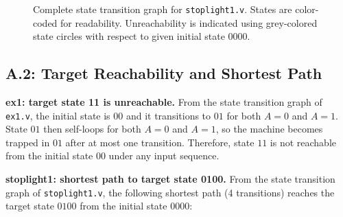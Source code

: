 \documentclass[10pt]{article}
\begin{document}
\begin{figure}[H]
\center
\caption{Complete state transition graph for \texttt{stoplight1.v}. States are color-coded for readability. Unreachability is indicated using grey-colored state circles with respect to given initial state 0000.}
\end{figure}




\subsection*{A.2: Target Reachability and Shortest Path}

\textbf{ex1: target state 11 is unreachable.}
From the state transition graph of \texttt{ex1.v}, the initial state is $00$ and it transitions to $01$ for both $A=0$ and $A=1$.
State $01$ then self-loops for both $A=0$ and $A=1$, so the machine becomes trapped in $01$ after at most one transition.
Therefore, state $11$ is not reachable from the initial state $00$ under any input sequence.

\vspace{2mm}

\noindent
\textbf{stoplight1: shortest path to target state 0100.}
From the state transition graph of \texttt{stoplight1.v}, the following shortest path (4 transitions) reaches the target state $0100$ from the initial state $0000$:
\end{document}
